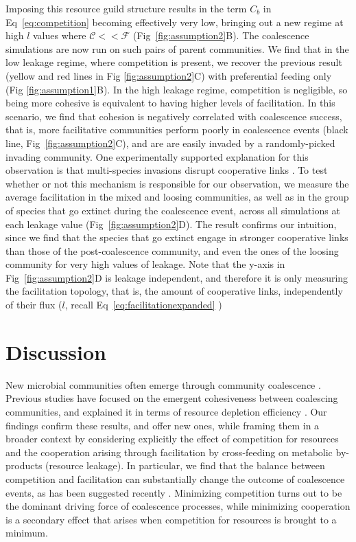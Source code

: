 \documentclass[10pt,letterpaper]{article}
\begin{document}
 Imposing this resource guild structure results in the term $C_b$ in Eq~\ref{eq:competition} becoming effectively very low, bringing out a new regime at high $l$ values where $\mathcal{C} << \mathcal{F}$ (Fig~\ref{fig:assumption2}B). The coalescence simulations are now run on such pairs of parent communities. We find that in the low leakage regime, where competition is present, we recover the previous result (yellow and red lines in Fig \ref{fig:assumption2}C) with preferential feeding only (Fig \ref{fig:assumption1}B). In the high leakage regime, competition is negligible, so being more cohesive is equivalent to having higher levels of facilitation. In this scenario, we find that cohesion is negatively correlated with coalescence success, that is, more facilitative communities perform poorly in coalescence events (black line, Fig~\ref{fig:assumption2}C), and are are easily invaded by a randomly-picked invading community. One experimentally supported explanation for this observation is that multi-species invasions disrupt cooperative links \cite{Machado, Altieri2010, Li2019}. To test whether or not this mechanism is responsible for our observation, we measure the average facilitation in the mixed and loosing communities, as well as in the group of species that go extinct during the coalescence event, across all simulations at each leakage value (Fig~\ref{fig:assumption2}D). The result confirms our intuition, since we find that the species that go extinct engage in stronger cooperative links than those of the post-coalescence community, and even the ones of the loosing community for very high values of leakage. Note that the y-axis in Fig~\ref{fig:assumption2}D is leakage independent, and therefore it is only measuring the facilitation topology, that is, the amount of cooperative links, independently of their flux ($l$, recall Eq~\ref{eq:facilitationexpanded} )
 
\section*{Discussion}

New microbial communities often emerge through community coalescence  \cite{Rillig2015}. Previous studies have focused on the emergent cohesiveness between coalescing communities, and explained it in terms of resource depletion efficiency \cite{Gilpin1994, Toquenaga1997, Livingston2013, Tikhonov2016, Sierocinski2017, Tikhonov2017, Lu2018, Rivett2018}. Our findings confirm these results, and offer new ones, while framing them in a broader context by considering explicitly the effect of competition for resources and the cooperation arising through facilitation by cross-feeding on metabolic by-products (resource leakage). In particular, we find that the balance between competition and facilitation can substantially change the outcome of coalescence events, as has been suggested recently \cite{Castledine2020}. Minimizing competition turns out to be the dominant driving force of coalescence processes, while minimizing cooperation is a secondary effect that arises when competition for resources is brought to a minimum.
\end{document}
